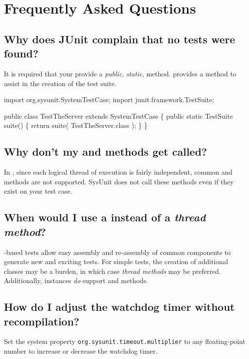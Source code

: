 \newcommand{\faq}[1]{\section{\textsf{\normalsize{#1}}}}

\chapter{Frequently Asked Questions}

\faq{Why does JUnit complain that no tests were found?}

It is required that your  provide a
\emph{public}, \emph{static}, 
method.   provides a
method to assist in the creation of the test suite.

\begin{codelisting}
import org.sysunit.SystemTestCase;
import junit.framework.TestSuite;

public class TestTheServer
    extends SystemTestCase
\{
    public static TestSuite suite()
    \{
        return suite( TestTheServer.class );
    \}
\}
\end{codelisting}

\faq{Why don't my  and 
methods get called?}

In , since each logical thread of execution
is fairly independent, common  and 
methods are not supported.  SysUnit does not call these methods
even if they exist on your test case.

\faq{When would I use a  instead of
a \emph{thread method}?}

-based tests allow easy assembly and re-assembly
of common components to generate new and exciting tests.  For
simple tests, the creation of additional  classes
may be a burden, in which case \emph{thread methods} may 
be preferred.  Additionally,  instances \emph{do}
support  and
 methods.

\faq{How do I adjust the watchdog timer without recompilation?}

Set the system property \texttt{org.sysunit.timeout.multiplier}
to any floating-point number to increase or decrease the watchdog
timer.
